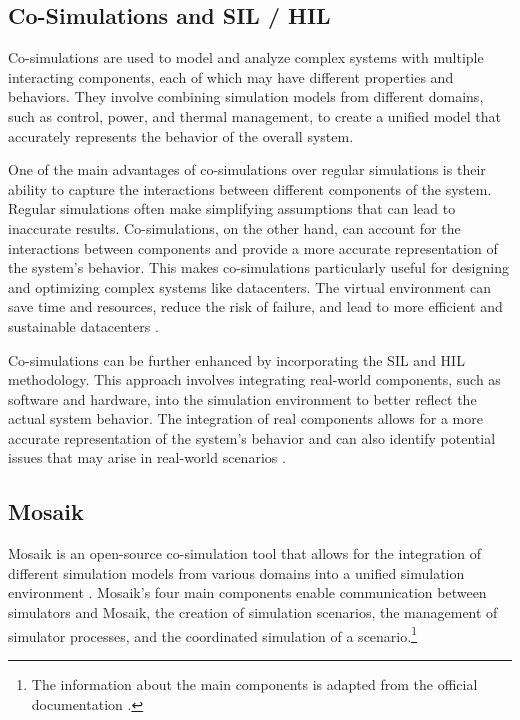 \subsection{Co-Simulations and SIL / HIL}

Co-simulations are used to model and analyze complex systems with multiple
interacting components, each of which may have different properties and
behaviors. They involve combining simulation models from different domains, such
as control, power, and thermal management, to create a unified model that
accurately represents the behavior of the overall system.

One of the main advantages of co-simulations over regular simulations is their
ability to capture the interactions between different components of the system.
Regular simulations often make simplifying assumptions that can lead to
inaccurate results. Co-simulations, on the other hand, can account for the
interactions between components and provide a more accurate representation of
the system's behavior. This makes co-simulations particularly useful for
designing and optimizing complex systems like datacenters. The virtual
environment can save time and resources, reduce the risk of failure, and lead to
more efficient and sustainable datacenters \cite{vogt2018}.

Co-simulations can be further enhanced by incorporating the SIL and HIL
methodology. This approach involves integrating real-world components, such as
software and hardware, into the simulation environment to better reflect the
actual system behavior. The integration of real components allows for a more
accurate representation of the system's behavior and can also identify potential
issues that may arise in real-world scenarios \cite{kelemenova2013}.

\subsection{Mosaik}

Mosaik is an open-source co-simulation tool that allows for the integration of
different simulation models from various domains into a unified simulation
environment \cite{steinbrink2019}. Mosaik’s four main components enable
communication between simulators and Mosaik, the creation of simulation
scenarios, the management of simulator processes, and the coordinated simulation
of a scenario.\footnote{The information about the main components is adapted
from the official documentation \cite{mosaik_docs}.}

